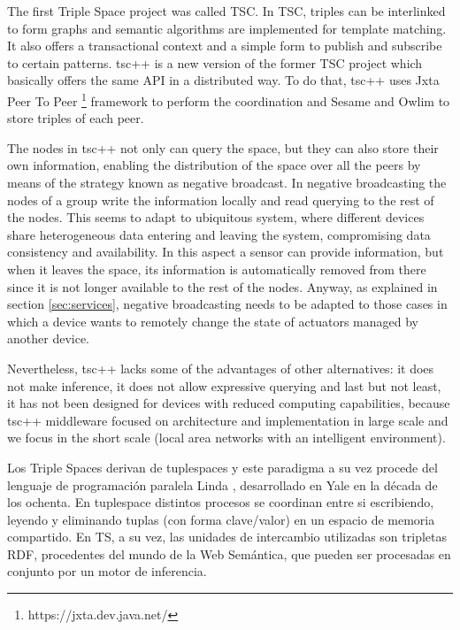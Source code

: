 The first Triple Space project was called TSC. In TSC, triples can be interlinked to form graphs and semantic
algorithms are implemented for template matching. It also offers a transactional context and a simple form to publish and subscribe to certain patterns.
tsc++ \cite{krummenacher_open_2009} is a new version of the former TSC project\cite{fensel_triple-space_2004} which basically offers
the same API in a distributed way. To do that, tsc++ uses Jxta Peer To Peer \footnote{https://jxta.dev.java.net/} framework to perform the
coordination and Sesame \cite{broekstra_sesame:_2002} and Owlim \cite{kiryakov_owlimpragmatic_2005} to store triples of each peer.

The nodes in tsc++ not only can query the space, but they can also store their own information, enabling the distribution
of the space over all the peers by means of the strategy known as negative broadcast. In negative broadcasting the nodes
of a group write the information locally and read querying to the rest of the nodes. This seems to adapt to
ubiquitous system, where different devices share heterogeneous data entering and leaving the system, compromising data consistency
and availability. In this aspect a sensor can provide information, but when it leaves the space, its information is automatically
removed from there since it is not longer available to the rest of the nodes. Anyway, as explained in section \ref{sec:services},
negative broadcasting needs to be adapted to those cases in which a device wants to remotely change the state of actuators managed
by another device.

Nevertheless, tsc++ lacks some of the advantages of other alternatives: it does not make inference, it does not allow expressive querying
and last but not least, it has not been designed for devices with reduced computing capabilities, because tsc++ middleware focused on
architecture and implementation in large scale and we focus in the short scale (local area networks with an intelligent environment).

Los Triple Spaces derivan de tuplespaces y este paradigma a su vez procede del lenguaje de programación paralela Linda \cite{gelernter_generative_1985}, desarrollado en Yale en la década de los ochenta. En tuplespace distintos procesos se coordinan entre si escribiendo, leyendo y eliminando tuplas (con forma clave/valor) en un espacio de memoria compartido. En TS, a su vez, las unidades de intercambio utilizadas son tripletas RDF, procedentes del mundo de la Web Semántica, que pueden ser procesadas en conjunto por un motor de inferencia.

